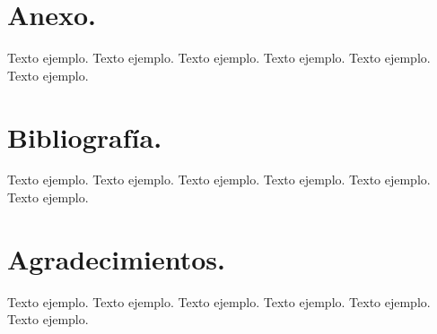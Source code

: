 \documentclass[12pt,a4paper]{article}
\begin{document}
\section{Anexo.}
Texto ejemplo. Texto ejemplo. Texto ejemplo. Texto ejemplo. Texto ejemplo. Texto ejemplo.

\section{Bibliografía.}
Texto ejemplo. Texto ejemplo. Texto ejemplo. Texto ejemplo. Texto ejemplo. Texto ejemplo.

\section{Agradecimientos.}
Texto ejemplo. Texto ejemplo. Texto ejemplo. Texto ejemplo. Texto ejemplo. Texto ejemplo.
\end{document}
